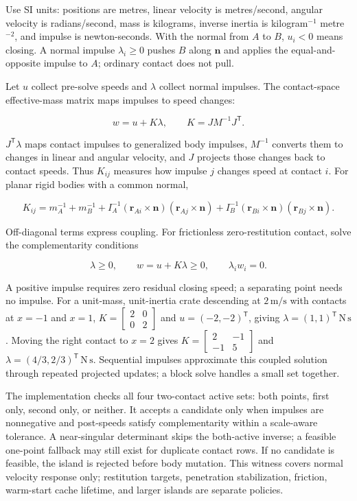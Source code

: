 Use SI units: positions are metres, linear velocity is metres/second, angular velocity is radians/second, mass is kilograms, inverse inertia is kilogram\(^{-1}\) metre\(^{-2}\), and impulse is newton-seconds. With the normal from \(A\) to \(B\), \(u_i<0\) means closing. A normal impulse \(\lambda_i\ge0\) pushes \(B\) along \(\mathbf n\) and applies the equal-and-opposite impulse to \(A\); ordinary contact does not pull.

Let \(u\) collect pre-solve speeds and \(\lambda\) collect normal impulses. The contact-space effective-mass matrix maps impulses to speed changes:

\[
w=u+K\lambda,\qquad K=JM^{-1}J^\mathsf T.
\]

\(J^\mathsf T\lambda\) maps contact impulses to generalized body impulses, \(M^{-1}\) converts them to changes in linear and angular velocity, and \(J\) projects those changes back to contact speeds. Thus \(K_{ij}\) measures how impulse \(j\) changes speed at contact \(i\). For planar rigid bodies with a common normal,

\[
K_{ij}=m_A^{-1}+m_B^{-1}+I_A^{-1}(\mathbf r_{Ai}\times\mathbf n)(\mathbf r_{Aj}\times\mathbf n)+I_B^{-1}(\mathbf r_{Bi}\times\mathbf n)(\mathbf r_{Bj}\times\mathbf n).
\]

Off-diagonal terms express coupling. For frictionless zero-restitution contact, solve the complementarity conditions

\[
\lambda\ge0,\qquad w=u+K\lambda\ge0,\qquad \lambda_iw_i=0.
\]

A positive impulse requires zero residual closing speed; a separating point needs no impulse. For a unit-mass, unit-inertia crate descending at \(2\,\mathrm{m/s}\) with contacts at \(x=-1\) and \(x=1\), \(K=\begin{bmatrix}2&0\\0&2\end{bmatrix}\) and \(u=(-2,-2)^\mathsf T\), giving \(\lambda=(1,1)^\mathsf T\,\mathrm{N\,s}\). Moving the right contact to \(x=2\) gives \(K=\begin{bmatrix}2&-1\\-1&5\end{bmatrix}\) and \(\lambda=(4/3,2/3)^\mathsf T\,\mathrm{N\,s}\). Sequential impulses approximate this coupled solution through repeated projected updates; a block solve handles a small set together.

The implementation checks all four two-contact active sets: both points, first only, second only, or neither. It accepts a candidate only when impulses are nonnegative and post-speeds satisfy complementarity within a scale-aware tolerance. A near-singular determinant skips the both-active inverse; a feasible one-point fallback may still exist for duplicate contact rows. If no candidate is feasible, the island is rejected before body mutation. This witness covers normal velocity response only; restitution targets, penetration stabilization, friction, warm-start cache lifetime, and larger islands are separate policies.

